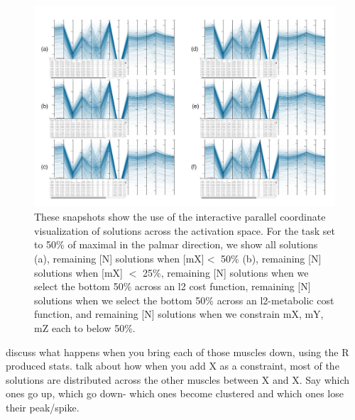 \begin{figure}[htbp]
\centering
\includegraphics[width=\textwidth]{figs/parcoords.pdf}
\caption{These snapshots show the use of the interactive parallel coordinate visualization of solutions across the activation space. For the task set to 50\% of maximal in the palmar direction, we show all solutions (a), remaining [N] solutions when [mX]$<$ 50\% (b), remaining [N] solutions when [mX] $<$ 25\%, remaining [N] solutions when we select the bottom 50\% across an l2 cost function, remaining [N] solutions when we select the bottom 50\% across an l2-metabolic cost function, and remaining [N] solutions when we constrain mX, mY, mZ each to below 50\%. }
\label{fig:parcoords}
\end{figure}

discuss what happens when you bring each of those muscles down, using the R produced stats.
talk about how when you add X as a constraint, most of the solutions are distributed across the other muscles between X and X. Say which ones go up, which go down- which ones become clustered and which ones lose their peak/spike.

